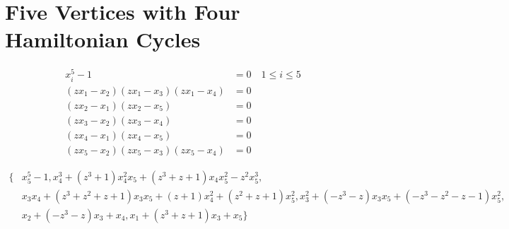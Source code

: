 \documentclass[letterpaper]{article}
\newcommand{\aln}[1]{\begin{align*} #1 \end{align*}} %
\begin{document}
\section{Five Vertices with Four Hamiltonian Cycles}
\begin{center}
\end{center}

\aln{
  x_i^5 - 1 &= 0 \quad 1 \leq i \leq 5\\
  (z x_1 - x_2) (z x_1 - x_3) (z x_1 - x_4) &= 0\\
  (z x_2 - x_1) (z x_2 - x_5) &= 0\\
  (z x_3 - x_2) (z x_3 - x_4) &= 0\\
  (z x_4 - x_1) (z x_4 - x_5) &= 0\\
  (z x_5 - x_2) (z x_5 - x_3) (z x_5 - x_4) &= 0
}

\aln{
	\{& x_5^5-1, x_4^3+(z^3+1)x_4^2x_5+(z^3+z+1)x_4x_5^2-z^2x_5^3,\\& x_3x_4+(z^3+z^2+z+1)x_3x_5+(z+1)x_4^2+(z^2+z+1)x_5^2, x_3^2+(-z^3-z)x_3x_5+(-z^3-z^2-z-1)x_5^2,\\& x_2+(-z^3-z)x_3+x_4, x_1+(z^3+z+1)x_3+x_5\}
}
\end{document}

